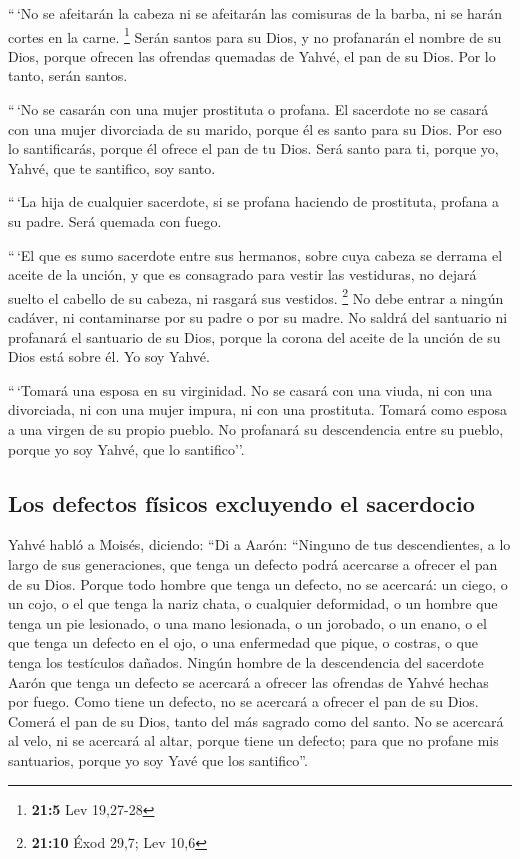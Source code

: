 \begin{paracol}{2}
 ``\,`No se afeitarán la cabeza ni se afeitarán las
comisuras de la barba, ni se harán cortes en la carne. \footnote{\textbf{21:5}
  Lev 19,27-28}  Serán santos para su Dios, y no
profanarán el nombre de su Dios, porque ofrecen las ofrendas quemadas de
Yahvé, el pan de su Dios. Por lo tanto, serán santos.

 ``\,`No se casarán con una mujer prostituta o profana. El
sacerdote no se casará con una mujer divorciada de su marido, porque él
es santo para su Dios.  Por eso lo santificarás, porque él
ofrece el pan de tu Dios. Será santo para ti, porque yo, Yahvé, que te
santifico, soy santo.

 ``\,`La hija de cualquier sacerdote, si se profana
haciendo de prostituta, profana a su padre. Será quemada con fuego.

 ``\,`El que es sumo sacerdote entre sus hermanos, sobre
cuya cabeza se derrama el aceite de la unción, y que es consagrado para
vestir las vestiduras, no dejará suelto el cabello de su cabeza, ni
rasgará sus vestidos. \footnote{\textbf{21:10} Éxod 29,7; Lev 10,6}
 No debe entrar a ningún cadáver, ni contaminarse por su
padre o por su madre.  No saldrá del santuario ni
profanará el santuario de su Dios, porque la corona del aceite de la
unción de su Dios está sobre él. Yo soy Yahvé.

 ``\,`Tomará una esposa en su virginidad. 
No se casará con una viuda, ni con una divorciada, ni con una mujer
impura, ni con una prostituta. Tomará como esposa a una virgen de su
propio pueblo.  No profanará su descendencia entre su
pueblo, porque yo soy Yahvé, que lo santifico''.

\hypertarget{los-defectos-fuxedsicos-excluyendo-el-sacerdocio}{%
\subsection{Los defectos físicos excluyendo el
sacerdocio}\label{los-defectos-fuxedsicos-excluyendo-el-sacerdocio}}

 Yahvé habló a Moisés, diciendo:  ``Di a
Aarón: ``Ninguno de tus descendientes, a lo largo de sus generaciones,
que tenga un defecto podrá acercarse a ofrecer el pan de su Dios.
 Porque todo hombre que tenga un defecto, no se acercará:
un ciego, o un cojo, o el que tenga la nariz chata, o cualquier
deformidad,  o un hombre que tenga un pie lesionado, o
una mano lesionada,  o un jorobado, o un enano, o el que
tenga un defecto en el ojo, o una enfermedad que pique, o costras, o que
tenga los testículos dañados.  Ningún hombre de la
descendencia del sacerdote Aarón que tenga un defecto se acercará a
ofrecer las ofrendas de Yahvé hechas por fuego. Como tiene un defecto,
no se acercará a ofrecer el pan de su Dios.  Comerá el
pan de su Dios, tanto del más sagrado como del santo.  No
se acercará al velo, ni se acercará al altar, porque tiene un defecto;
para que no profane mis santuarios, porque yo soy Yavé que los
santifico''.


\end{paracol}
